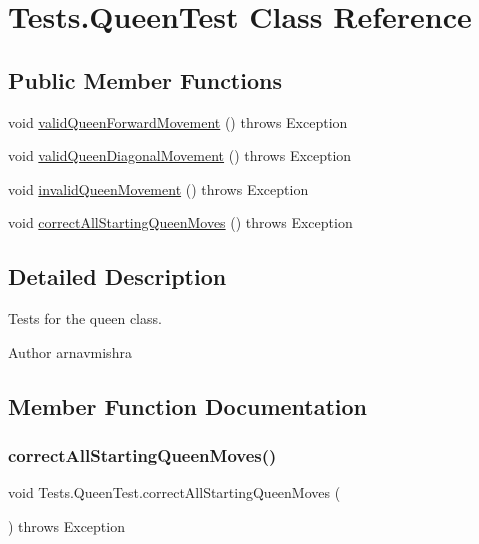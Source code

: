 \hypertarget{class_tests_1_1_queen_test}{}\section{Tests.\+Queen\+Test Class Reference}
\label{class_tests_1_1_queen_test}
\subsection*{Public Member Functions}
\begin{DoxyCompactItemize}
\item 
void \hyperlink{class_tests_1_1_queen_test_a8bec252c50587e572eaf3d36fb719d6f}{valid\+Queen\+Forward\+Movement} ()  throws Exception 
\item 
void \hyperlink{class_tests_1_1_queen_test_ae35369361ac4313f3bf86f111479fa75}{valid\+Queen\+Diagonal\+Movement} ()  throws Exception 
\item 
void \hyperlink{class_tests_1_1_queen_test_a0948894af0233e52a11873b7506674bb}{invalid\+Queen\+Movement} ()  throws Exception 
\item 
void \hyperlink{class_tests_1_1_queen_test_a888740ec9527c4998b55eb32bd3c2315}{correct\+All\+Starting\+Queen\+Moves} ()  throws Exception 
\end{DoxyCompactItemize}


\subsection{Detailed Description}
Tests for the queen class. \begin{DoxyAuthor}{Author}
arnavmishra 
\end{DoxyAuthor}


\subsection{Member Function Documentation}
\hypertarget{class_tests_1_1_queen_test_a888740ec9527c4998b55eb32bd3c2315}{}\label{class_tests_1_1_queen_test_a888740ec9527c4998b55eb32bd3c2315} 
\subsubsection{\texorpdfstring{correct\+All\+Starting\+Queen\+Moves()}{correctAllStartingQueenMoves()}}
{\footnotesize\ttfamily void Tests.\+Queen\+Test.\+correct\+All\+Starting\+Queen\+Moves (\begin{DoxyParamCaption}{ }\end{DoxyParamCaption}) throws Exception}

